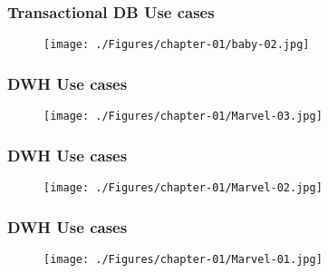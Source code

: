 \begin{frame}
\frametitle{Transactional DB Use cases}
\begin{figure}[ht]

\centering
\texttt{[image: ./Figures/chapter-01/baby-02.jpg]}
\end{figure}
\end{frame}


\begin{frame}
\frametitle{DWH Use cases}
\begin{figure}[ht]

\centering
\texttt{[image: ./Figures/chapter-01/Marvel-03.jpg]}
\end{figure}
\end{frame}

\begin{frame}
\frametitle{DWH Use cases}
\begin{figure}[ht]

\centering
\texttt{[image: ./Figures/chapter-01/Marvel-02.jpg]}
\end{figure}
\end{frame}

\begin{frame}
\frametitle{DWH Use cases}
\begin{figure}[ht]

\centering
\texttt{[image: ./Figures/chapter-01/Marvel-01.jpg]}
\end{figure}
\end{frame}





